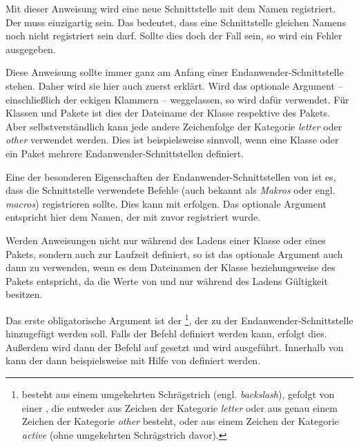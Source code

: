 \begin{Declaration}
\end{Declaration}
Mit dieser Anweisung wird eine neue Schnittstelle mit dem Namen
 registriert. Der
 muss einzigartig sein. Das bedeutet, dass eine
Schnittstelle gleichen Namens noch nicht registriert sein darf. Sollte dies
doch der Fall sein, so wird ein Fehler ausgegeben.

Diese Anweisung sollte immer ganz am Anfang einer Endanwender-Schnittstelle
stehen. Daher wird sie hier auch zuerst erklärt. Wird das optionale Argument
-- einschließlich der eckigen Klammern -- weggelassen, so wird dafür
 verwendet. Für Klassen und
Pakete ist dies der Dateiname der Klasse respektive des Pakets. Aber
selbstverständlich kann jede andere Zeichenfolge der Kategorie \emph{letter}
oder \emph{other} verwendet werden. Dies ist beispielsweise sinnvoll, wenn
eine Klasse oder ein Paket mehrere Endanwender-Schnittstellen definiert.%
\EndIndexGroup


\begin{Declaration}
\end{Declaration}
Eine der besonderen Eigenschaften der Endanwender-Schnittstellen von
 ist es, dass die Schnittstelle verwendete Befehle (auch
bekannt als \emph{Makros} oder engl. \emph{macros}) registrieren sollte. Dies
kann mit  erfolgen. Das optionale Argument
 entspricht hier dem Namen, der mit
 zuvor registriert wurde.

Werden Anweisungen nicht nur während des Ladens einer
Klasse oder eines Pakets, sondern auch zur Laufzeit definiert, so ist das
optionale Argument auch dann zu verwenden, wenn es dem Dateinamen der Klasse
beziehungsweise des Pakets entspricht, da die Werte von  und
 nur während des Ladens Gültigkeit besitzen.

Das erste obligatorische Argument ist der
\footnote{ besteht aus einem umgekehrten
  Schrägstrich (engl. \emph{backslash}), gefolgt von einer
  , die entweder aus Zeichen der Kategorie \emph{letter}
  oder aus genau einem Zeichen der Kategorie \emph{other} besteht, oder aus
  einem Zeichen der Kategorie \emph{active} (ohne umgekehrten Schrägstrich
  davor).}, der zu der Endanwender-Schnittstelle hinzugefügt werden
soll. Falls der Befehl definiert werden kann, erfolgt dies. Außerdem wird dann
der Befehl auf  gesetzt und  wird
ausgeführt. Innerhalb von  kann der  dann
beispielsweise mit Hilfe von  definiert werden.


